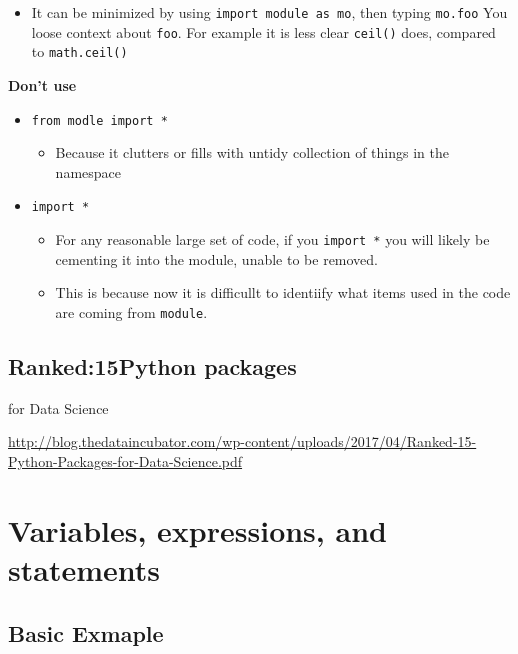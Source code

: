 \documentclass[
]{book}
\providecommand{\tightlist}{%
  \setlength{\itemsep}{0pt}\setlength{\parskip}{0pt}}
\begin{document}
\begin{itemize}
\tightlist
\item
  It can be minimized by using \texttt{import\ module\ as\ mo}, then typing \texttt{mo.foo} \textbar{} You loose context about \texttt{foo}. For example it is less clear \texttt{ceil()} does, compared to \texttt{math.ceil()}
\end{itemize}

\textbf{Don't use}

\begin{itemize}
\item
  \texttt{from\ modle\ import\ *}

  \begin{itemize}
  \tightlist
  \item
    Because it clutters or fills with untidy collection of things in the namespace
  \end{itemize}
\item
  \texttt{import\ *}

  \begin{itemize}
  \item
    For any reasonable large set of code, if you \texttt{import\ *} you will likely be cementing it into the module, unable to be removed.
  \item
    This is because now it is difficullt to identiify what items used in the code are coming from \texttt{module}.
  \end{itemize}
\end{itemize}

\hypertarget{ranked15python-packages}{%
\section{Ranked:15Python packages}\label{ranked15python-packages}}

for Data Science

\url{http://blog.thedataincubator.com/wp-content/uploads/2017/04/Ranked-15-Python-Packages-for-Data-Science.pdf}

\hypertarget{variables-expressions-and-statements}{%
\chapter{Variables, expressions, and statements}\label{variables-expressions-and-statements}}

\hypertarget{basic-exmaple}{%
\section{Basic Exmaple}\label{basic-exmaple}}
\end{document}
